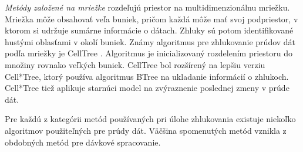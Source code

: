 \textit{Metódy založené na mriežke}
rozdeľujú priestor na multidimenzionálnu mriežku. Mriežka môže obsahovať veľa buniek, pričom každá môže mať svoj podpriestor, v ktorom si udržuje sumárne informácie o dátach. Zhluky sú potom identifikované hustými oblasťami v okolí buniek. Známy algoritmus pre zhlukovanie prúdov dát podľa mriežky je CellTree \citep{han2011data}. Algoritmus je inicializovaný rozdelením priestoru do množiny rovnako veľkých buniek. CellTree bol rozšírený na lepšiu verziu Cell*Tree, ktorý používa algoritmus BTree na ukladanie informácií o zhlukoch. Cell*Tree tiež aplikuje starnúci model na zvýraznenie poslednej zmeny v prúde dát.
\par
Pre každú z kategórii metód používaných pri úlohe zhlukovania existuje niekoľko algoritmov použiteľných pre prúdy dát. Väčšina spomenutých metód vznikla z obdobných metód pre dávkové spracovanie.

